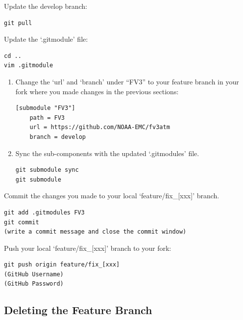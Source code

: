 \documentclass[11pt,fleqn]{report}              %
\begin{document}
Update the develop branch:
\lstset{language=bash}   
\begin{lstlisting}[frame=trBL]
git pull
\end{lstlisting}

Update the `.gitmodule' file:
\lstset{language=bash}   
\begin{lstlisting}[frame=trBL]
cd ..
vim .gitmodule
\end{lstlisting}

\begin{enumerate}
\item Change the `url' and `branch' under ``FV3'' to your feature branch in your fork where you made changes in the previous sections:
\lstset{language=bash}   
\begin{lstlisting}[frame=trBL]
[submodule "FV3"]
    path = FV3
    url = https://github.com/NOAA-EMC/fv3atm
    branch = develop
\end{lstlisting}

\item Sync the sub-components with the updated `.gitmodules' file.
\lstset{language=bash}   
\begin{lstlisting}[frame=trBL]
git submodule sync
git submodule
\end{lstlisting}
\end{enumerate}

Commit the changes you made to your local `feature/fix\_[xxx]' branch.
\lstset{language=bash}   
\begin{lstlisting}[frame=trBL]
git add .gitmodules FV3
git commit
(write a commit message and close the commit window)
\end{lstlisting}

Push your local `feature/fix\_[xxx]' branch to your fork:
\lstset{language=bash}   
\begin{lstlisting}[frame=trBL]
git push origin feature/fix_[xxx]
(GitHub Username)
(GitHub Password)
\end{lstlisting}



\subsection{Deleting the Feature Branch}
\end{document}
